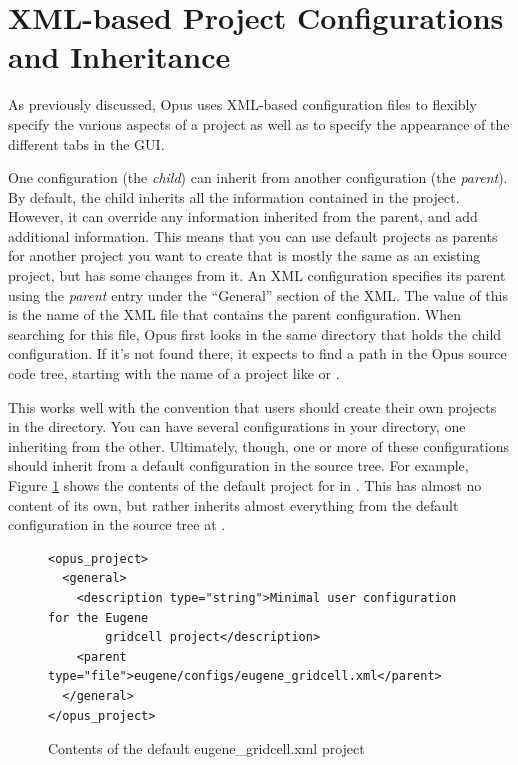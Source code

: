 \section{XML-based Project Configurations and Inheritance}
\label{section:xml-inheritance}

As previously discussed, Opus uses XML-based configuration files to
flexibly specify the various aspects of a project as well as to specify the
appearance of the different tabs in the GUI\@.

One configuration (the \emph{child}) can inherit from another configuration
(the \emph{parent}).  By default, the child inherits all the information
contained in the project.  However, it can override any information
inherited from the parent, and add additional information.  This means that
you can use default projects as parents for another project you want to
create that is mostly the same as an existing project, but has some changes
from it.  An XML configuration specifies its parent using the \emph{parent}
entry under the ``General'' section of the XML\@.  The value of this is the
name of the XML file that contains the parent configuration.  When
searching for this file, Opus first looks in the same directory that holds
the child configuration.  If it's not found there, it expects to find a
path in the Opus source code tree, starting with the name of a project like
 or .

This works well with the convention that users should create their own
projects in the  directory.  You can have
several configurations in your  directory, one
inheriting from the other.  Ultimately, though, one or more of these
configurations should inherit from a default configuration in the source
tree.  For example, Figure \ref{fig:eugene-gridcell-xml-default} shows the
contents of the default project for  in
.  This has almost no content of its own, but
rather inherits almost everything from the default configuration in the
source tree at .

\begin{figure}[htp]
\begin{center}
\begin{verbatim}
<opus_project>
  <general>
    <description type="string">Minimal user configuration for the Eugene 
        gridcell project</description>
    <parent type="file">eugene/configs/eugene_gridcell.xml</parent>
  </general>
</opus_project>
\end{verbatim}
\end{center}
\caption{Contents of the default eugene\_gridcell.xml project}
\label{fig:eugene-gridcell-xml-default}
\end{figure}

